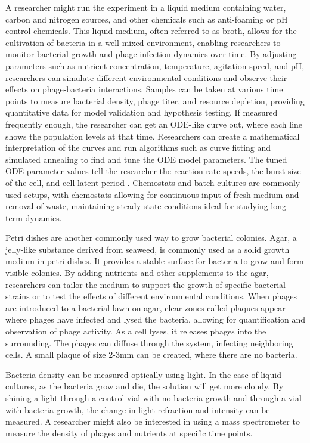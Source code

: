 A researcher might run the experiment in a liquid medium containing water, carbon and nitrogen sources, and other chemicals such as anti-foaming or pH control chemicals. 
This liquid medium, often referred to as broth, allows for the cultivation of bacteria in a well-mixed environment, enabling researchers to monitor bacterial growth and phage infection dynamics over time. 
By adjusting parameters such as nutrient concentration, temperature, agitation speed, and pH, researchers can simulate different environmental conditions and observe their effects on phage-bacteria interactions. 
Samples can be taken at various time points to measure bacterial density, phage titer, and resource depletion, providing quantitative data for model validation and hypothesis testing. 
If measured frequently enough, the researcher can get an ODE-like curve out, where each line shows the population levels at that time. 
Researchers can create a mathematical interpretation of the curves and run algorithms such as curve fitting and simulated annealing to find and tune the ODE model parameters. 
The tuned ODE parameter values tell the researcher the reaction rate speeds, the burst size of the cell, and cell latent period \cite{gengUsingBacterialPopulation2024, mullaExtremeDiversityPhage2024}. 
Chemostats and batch cultures are commonly used setups, with chemostats allowing for continuous input of fresh medium and removal of waste, maintaining steady-state conditions ideal for studying long-term dynamics.

Petri dishes are another commonly used way to grow bacterial colonies. 
Agar, a jelly-like substance derived from seaweed, is commonly used as a solid growth medium in petri dishes. 
It provides a stable surface for bacteria to grow and form visible colonies. 
By adding nutrients and other supplements to the agar, researchers can tailor the medium to support the growth of specific bacterial strains or to test the effects of different environmental conditions. 
When phages are introduced to a bacterial lawn on agar, clear zones called plaques appear where phages have infected and lysed the bacteria, allowing for quantification and observation of phage activity. 
As a cell lyses, it releases phages into the surrounding. 
The phages can diffuse through the system, infecting neighboring cells. 
A small plaque of size 2-3mm can be created, where there are no bacteria. 

Bacteria density can be measured optically using light. 
In the case of liquid cultures, as the bacteria grow and die, the solution will get more cloudy. 
By shining a light through a control vial with no bacteria growth and through a vial with bacteria growth, the change in light refraction and intensity can be measured. 
A researcher might also be interested in using a mass spectrometer to measure the density of phages and nutrients at specific time points. 

